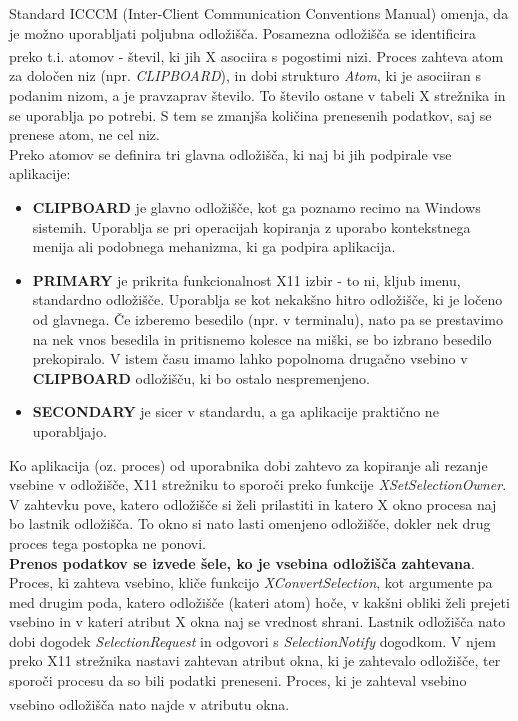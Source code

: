 \documentclass[12pt, A4]{article}
\begin{document}
	Standard ICCCM (Inter-Client Communication Conventions Manual) omenja, da je možno uporabljati poljubna odložišča. Posamezna odložišča se identificira preko t.i. atomov\textsuperscript{\cite{xdocs}} - števil, ki jih X asociira s pogostimi nizi. Proces zahteva atom za določen niz (npr. \textit{CLIPBOARD}), in dobi strukturo \textit{Atom}, ki je asociiran s podanim nizom, a je pravzaprav število. To število ostane v tabeli X strežnika in se uporablja po potrebi. S tem se zmanjša količina prenesenih podatkov, saj se prenese atom, ne cel niz. \\
	
	Preko atomov se definira tri glavna odložišča, ki naj bi jih podpirale vse aplikacije:
	\begin{itemize}
		\item \textbf{CLIPBOARD} je glavno odložišče, kot ga poznamo recimo na Windows sistemih. Uporablja se pri operacijah kopiranja z uporabo kontekstnega menija ali podobnega mehanizma, ki ga podpira aplikacija.
		\item \textbf{PRIMARY} je prikrita funkcionalnost X11 izbir - to ni, kljub imenu, standardno odložišče. Uporablja se kot nekakšno hitro odložišče, ki je ločeno od glavnega. Če izberemo besedilo (npr. v terminalu), nato pa se prestavimo na nek vnos besedila in pritisnemo kolesce na miški, se bo izbrano besedilo prekopiralo. V istem času imamo lahko popolnoma drugačno vsebino v \textbf{CLIPBOARD} odložišču, ki bo ostalo nespremenjeno.
		\item \textbf{SECONDARY} je sicer v standardu, a ga aplikacije praktično ne uporabljajo.
	\end{itemize}
	
	Ko aplikacija (oz. proces) od uporabnika dobi zahtevo za kopiranje ali rezanje vsebine v odložišče, X11 strežniku to sporoči preko funkcije \textit{XSetSelectionOwner}. V zahtevku pove, katero odložišče si želi prilastiti in katero X okno procesa naj bo lastnik odložišča. To okno si nato lasti omenjeno odložišče, dokler nek drug proces tega postopka ne ponovi. \\
		
	\textbf{Prenos podatkov se izvede šele, ko je vsebina odložišča zahtevana}. Proces, ki zahteva vsebino, kliče funkcijo \textit{XConvertSelection}, kot argumente pa med drugim poda, katero odložišče (kateri atom) hoče, v kakšni obliki želi prejeti vsebino in v kateri atribut X okna naj se vrednost shrani. Lastnik odložišča nato dobi dogodek \textit{SelectionRequest} in odgovori s \textit{SelectionNotify} dogodkom. V njem preko X11 strežnika nastavi zahtevan atribut okna, ki je zahtevalo odložišče, ter sporoči procesu da so bili podatki preneseni. Proces, ki je zahteval vsebino vsebino odložišča nato najde v atributu okna\textsuperscript{\cite{icccm}}.
\end{document}
